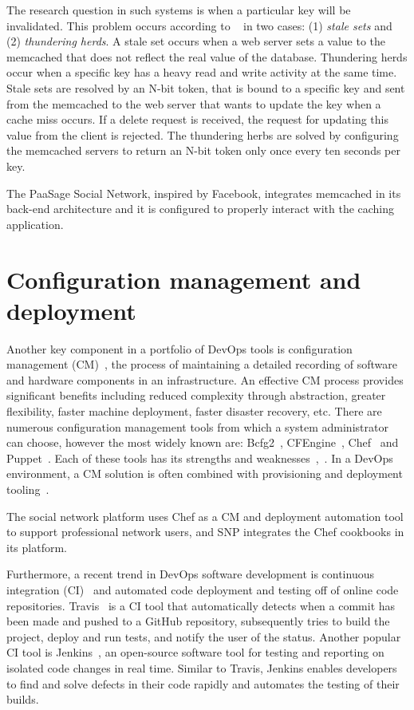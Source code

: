 The research question in such systems is when a particular key will be invalidated. This problem occurs according to ~\cite{nishtala2013scaling} in two cases: (1) \emph{stale sets} and (2) \emph{thundering herds}. A stale set occurs when a web server sets a value to the memcached that does not reflect the real value of the database. Thundering herds occur when a specific key has a heavy read and write activity at the same time. Stale sets are resolved by an N-bit token, that is bound to a specific key and sent from the memcached to the web server that wants to update the key when a cache miss occurs. If a delete request is received, the request for updating this value from the client is rejected. The thundering herbs are solved by configuring the memcached servers to return an N-bit token only once every ten seconds per key.

The PaaSage Social Network, inspired by Facebook, integrates memcached in its back-end architecture and it is configured to properly interact with the caching application.


\section{Configuration management and deployment}
\label{sec:config_manag}
Another key component in a portfolio of DevOps tools is configuration management (CM)~\cite{lueninghoener2011getting}, the process of maintaining a detailed recording of software and hardware components in an infrastructure. An effective CM process provides significant benefits including reduced complexity through abstraction, greater flexibility, faster machine deployment, faster disaster recovery, etc. There are numerous configuration management tools from which a system administrator can choose, however the most widely known are: Bcfg2~\cite{Bcfg2}, CFEngine~\cite{CFEngine}, Chef~\cite{Chef_base} and Puppet~\cite{Puppet}. Each of these tools has its strengths and weaknesses~\cite{tsalolikhin2010summary},~\cite{Delaet2010a}. In a DevOps environment, a CM solution is often combined with provisioning and deployment tooling~\cite{ibm-devops}.

The social network platform uses Chef as a CM and deployment automation tool to support professional network users, and SNP integrates the Chef cookbooks in its platform.

Furthermore, a recent trend in DevOps software development is continuous integration (CI)~\cite{fowler2006continuous} and automated code deployment and testing off of online code repositories. Travis~\cite{travis_url} is a CI tool that automatically detects when a commit has been made and pushed to a GitHub repository, subsequently tries to build the project, deploy and run tests, and notify the user of the status. Another popular CI tool is Jenkins~\cite{jenkins_url}, an open-source software tool for testing and reporting on isolated code changes in real time. Similar to Travis, Jenkins enables developers to find and solve defects in their code rapidly and automates the testing of their builds. 

